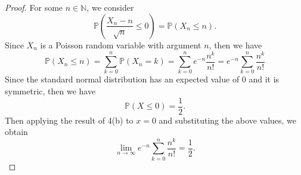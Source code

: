 \documentclass[12pt]{article}
\newcommand{\N}{\mathbb{N}}
\renewcommand{\P}{\mathbb{P}}
\begin{document}
\subsection{}

\begin{proof}
    For some $n \in \N$, we consider
    \[
        \P \left( \frac{X_n - n}{\sqrt{n}} \leq 0 \right) = \P(X_n \leq n).
    \]
    Since $X_n$ is a Poisson random variable with argument $n$, then we have
    \[
        \P(X_n \leq n) 
            = \sum_{k = 0}^n \P(X_n = k) 
            = \sum_{k = 0}^n e^{-n} \frac{n^k}{n!} 
            = e^{-n} \sum_{k = 0}^n \frac{n^k}{n!}
    \]
    Since the standard normal distribution has an expected value of $0$ and it is symmetric, then we have
    \[
        \P(X \leq 0) = \frac12.
    \]
    Then applying the result of 4(b) to $x = 0$ and substituting the above values, we obtain
    \[
        \lim_{n \to \infty} e^{-n} \sum_{k = 0}^n \frac{n^k}{n!} =  \frac12.
    \]
    
\end{proof}

\newpage
\section{}
\end{document}
